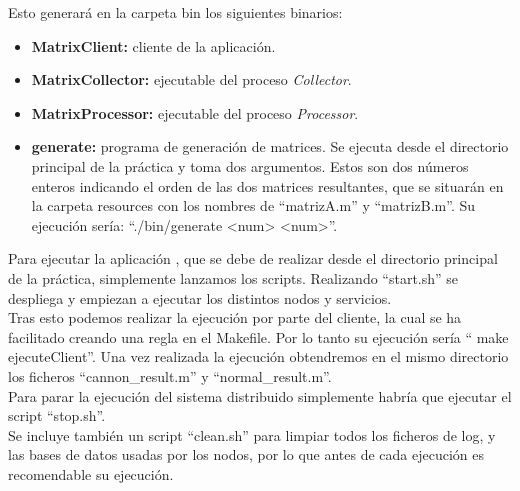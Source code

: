 Esto generará en la carpeta bin los siguientes binarios:
\begin{itemize}
\item \textbf{MatrixClient:} cliente de la aplicación.
\item \textbf{MatrixCollector:} ejecutable del proceso \emph{Collector}.
\item \textbf{MatrixProcessor:} ejecutable del proceso \emph{Processor}.
\item \textbf{generate:} programa de generación de matrices. Se ejecuta desde el directorio principal de la práctica y toma dos argumentos. Estos son dos números enteros indicando el orden de las dos matrices resultantes, que se situarán en la carpeta resources con los nombres de ``matrizA.m'' y ``matrizB.m''. Su ejecución sería: ``./bin/generate <num> <num>''.
\end{itemize}

Para ejecutar la aplicación , que se debe de realizar desde el directorio principal de la práctica, simplemente lanzamos los scripts.
Realizando ``start.sh'' se despliega y empiezan a ejecutar los distintos nodos y servicios. \\
Tras esto podemos realizar la ejecución por parte del cliente, la cual se ha facilitado creando una regla en el Makefile. Por lo tanto su ejecución sería `` make ejecuteClient''. Una vez realizada la ejecución obtendremos en el mismo directorio los ficheros ``cannon\_result.m'' y ``normal\_result.m''. \\
Para parar la ejecución del sistema distribuido simplemente habría que ejecutar el script ``stop.sh''. \\
Se incluye también un script ``clean.sh'' para limpiar todos los ficheros de log, y las bases de datos usadas por los nodos, por lo que antes de cada ejecución es recomendable su ejecución.
 
